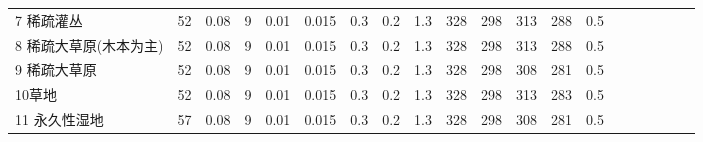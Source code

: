 \begin{sidewaystable}[]
\begin{tabular}{@{}lccccccccccccccccccc@{}}
        7 稀疏灌丛        & 52          & 0.08          & 9          & 0.01          & 0.015          & 0.3          & 0.2          & 1.3          & 328          & 298          & 313          & 288          & 0.5          \\
        8 稀疏大草原(木本为主) & 52          & 0.08          & 9          & 0.01          & 0.015          & 0.3          & 0.2          & 1.3          & 328          & 298          & 313          & 288          & 0.5          \\
        9 稀疏大草原       & 52          & 0.08          & 9          & 0.01          & 0.015          & 0.3          & 0.2          & 1.3          & 328          & 298          & 308          & 281          & 0.5          \\
        10草地          & 52          & 0.08          & 9          & 0.01          & 0.015          & 0.3          & 0.2          & 1.3          & 328          & 298          & 313          & 283          & 0.5          \\
        11 永久性湿地      & 57          & 0.08          & 9          & 0.01          & 0.015          & 0.3          & 0.2          & 1.3          & 328          & 298          & 308          & 281          & 0.5        \\\bottomrule
                \end{tabular}
    \end{sidewaystable}
    

